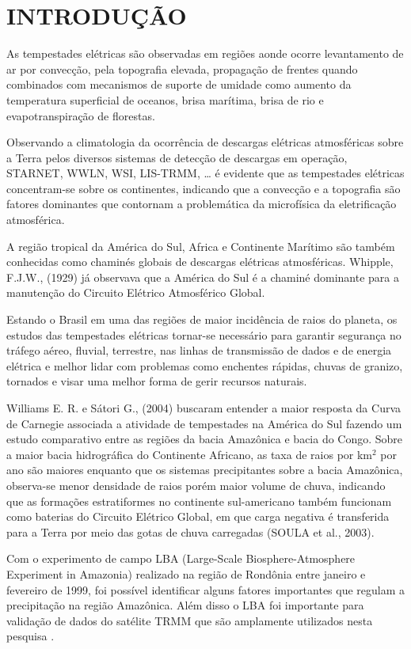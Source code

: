 \chapter{INTRODUÇÃO}


As tempestades elétricas 	são observadas em regiões aonde ocorre levantamento de ar por convecção, pela topografia elevada, propagação de frentes quando combinados com mecanismos de suporte de umidade como aumento da temperatura superficial de oceanos, brisa marítima, brisa de rio e evapotranspiração de florestas.

Observando a climatologia da ocorrência de descargas elétricas atmosféricas sobre a Terra pelos diversos sistemas de detecção de descargas em operação, STARNET, WWLN, WSI, LIS-TRMM, … é evidente que as tempestades elétricas concentram-se sobre os continentes, indicando que a convecção e a topografia são fatores dominantes que contornam a problemática da microfísica da eletrificação atmosférica.

A região tropical da América do Sul, Africa e Continente Marítimo são também conhecidas como chaminés globais de descargas elétricas atmosféricas. Whipple, F.J.W., (1929) já observava que a América do Sul é a chaminé dominante para a manutenção do Circuito Elétrico Atmosférico Global. 

Estando o Brasil em uma das regiões de maior incidência de raios do planeta, os estudos das tempestades elétricas tornar-se necessário para garantir segurança no tráfego aéreo, fluvial, terrestre, nas linhas de transmissão de dados e de energia elétrica e melhor lidar com problemas como enchentes rápidas, chuvas de granizo, tornados e visar uma melhor forma de gerir recursos naturais.

Williams E. R. e Sátori G., (2004) buscaram entender a maior resposta da Curva de Carnegie associada a atividade de tempestades na América do Sul fazendo um estudo comparativo entre as regiões da bacia Amazônica e bacia do Congo. Sobre a maior bacia hidrográfica do Continente Africano, as taxa de raios por km$^2$ por ano são maiores enquanto que os sistemas precipitantes sobre a bacia Amazônica, observa-se menor densidade de raios porém maior volume de chuva, indicando que as formações estratiformes no continente sul-americano também funcionam como baterias do Circuito Elétrico Global, em que carga negativa é transferida para a Terra por meio das gotas de chuva carregadas (SOULA et al., 2003).

Com o experimento de campo LBA (Large-Scale Biosphere-Atmosphere Experiment in Amazonia) realizado na região de Rondônia entre janeiro e fevereiro de 1999, foi possível identificar alguns fatores importantes que regulam a precipitação na região Amazônica. Além disso o LBA foi importante para validação de dados do satélite TRMM que são amplamente utilizados nesta pesquisa \cite{silva2002lba,williams2002,albrecht2011}.

